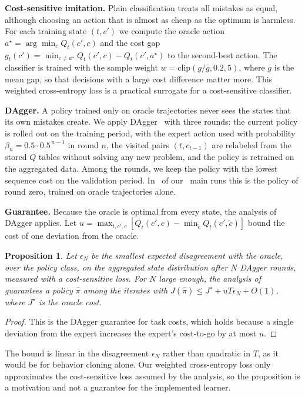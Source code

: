 \documentclass[preprint,12pt]{elsarticle}
\newtheorem{proposition}{Proposition}
\begin{document}
\textbf{Cost-sensitive imitation.} Plain classification treats all mistakes as equal, although choosing an action that is almost as cheap as the optimum is harmless. For each training state $(t,c')$ we compute the oracle action $a^\star=\arg\min_c Q_t(c',c)$ and the cost gap $g_t(c')=\min_{c\neq a^\star}Q_t(c',c)-Q_t(c',a^\star)$ to the second-best action. The classifier is trained with the sample weight $w=\mathrm{clip}(g/\bar g,0.2,5)$, where $\bar g$ is the mean gap, so that decisions with a large cost difference matter more. This weighted cross-entropy loss is a practical surrogate for a cost-sensitive classifier.

\textbf{DAgger.} A policy trained only on oracle trajectories never sees the states that its own mistakes create. We apply DAgger~\cite{ross2011dagger} with three rounds: the current policy is rolled out on the training period, with the expert action used with probability $\beta_n=0.5\cdot0.5^{\,n-1}$ in round $n$, the visited pairs $(t,c_{t-1})$ are relabeled from the stored $Q$ tables without solving any new problem, and the policy is retrained on the aggregated data. Among the rounds, we keep the policy with the lowest sequence cost on the validation period. In \daggerRoundZero\ of our \daggerRuns\ main runs this is the policy of round zero, trained on oracle trajectories alone.

\textbf{Guarantee.} Because the oracle is optimal from every state, the analysis of DAgger applies. Let $u=\max_{t,c',c}[Q_t(c',c)-\min_{\tilde c}Q_t(c',\tilde c)]$ bound the cost of one deviation from the oracle.

\begin{proposition}\label{prop:imitation}
Let $\epsilon_N$ be the smallest expected disagreement with the oracle, over the policy class, on the aggregated state distribution after $N$ DAgger rounds, measured with a cost-sensitive loss. For $N$ large enough, the analysis of~\cite{ross2011dagger} guarantees a policy $\hat\pi$ among the iterates with $J(\hat\pi)\le J^\star+uT\epsilon_N+O(1)$, where $J^\star$ is the oracle cost.
\end{proposition}
\begin{proof}
This is the DAgger guarantee for task costs, which holds because a single deviation from the expert increases the expert's cost-to-go by at most $u$.
\end{proof}

The bound is linear in the disagreement $\epsilon_N$ rather than quadratic in $T$, as it would be for behavior cloning alone. Our weighted cross-entropy loss only approximates the cost-sensitive loss assumed by the analysis, so the proposition is a motivation and not a guarantee for the implemented learner.
\end{document}
